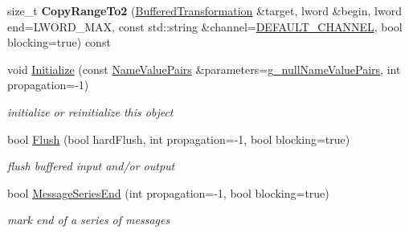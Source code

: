 \begin{DoxyCompactItemize}
\item 
\hypertarget{class_filter_ac0bbd9fb0969f6f48b8462d8529889aa}{
size\_\-t {\bfseries CopyRangeTo2} (\hyperlink{class_buffered_transformation}{BufferedTransformation} \&target, lword \&begin, lword end=LWORD\_\-MAX, const std::string \&channel=\hyperlink{cryptlib_8h_a6f1917f54ea8c2a45de6e08c5087c8de}{DEFAULT\_\-CHANNEL}, bool blocking=true) const }
\label{class_filter_ac0bbd9fb0969f6f48b8462d8529889aa}

\item 
\hypertarget{class_filter_a0c011bdc71755b373292e7a722e9e332}{
void \hyperlink{class_filter_a0c011bdc71755b373292e7a722e9e332}{Initialize} (const \hyperlink{class_name_value_pairs}{NameValuePairs} \&parameters=\hyperlink{cryptlib_8h_ab1b0f7d11a21c6163be8ca2662ce2ac6}{g\_\-nullNameValuePairs}, int propagation=-\/1)}
\label{class_filter_a0c011bdc71755b373292e7a722e9e332}

\begin{DoxyCompactList}\small\item\em initialize or reinitialize this object \item\end{DoxyCompactList}\item 
bool \hyperlink{class_filter_ad845deb5113d2bd04d109c05abfd3098}{Flush} (bool hardFlush, int propagation=-\/1, bool blocking=true)
\begin{DoxyCompactList}\small\item\em flush buffered input and/or output \item\end{DoxyCompactList}\item 
bool \hyperlink{class_filter_aa42c62587dda61266ac8195d9c9edb47}{MessageSeriesEnd} (int propagation=-\/1, bool blocking=true)
\begin{DoxyCompactList}\small\item\em mark end of a series of messages \item\end{DoxyCompactList}\end{DoxyCompactItemize}
